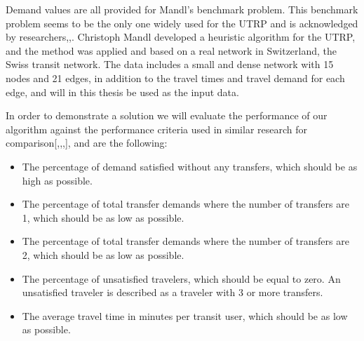 Demand values are all provided for Mandl's benchmark problem\citep{mandl79}. This benchmark problem seems to be the only one widely used for the UTRP and is acknowledged by researchers\citep{fan09},\citep{kechagiopoulos14},\citep{nikolic14}. Christoph Mandl\citep{mandl79} developed a heuristic algorithm for the UTRP, and the method was applied and based on a real network in Switzerland, the Swiss transit network\citep{mandl80}. The data includes a small and dense network with 15 nodes and 21 edges, in addition to the travel times and travel demand for each edge, and will in this thesis be used as the input data. %



In order to demonstrate a solution we will evaluate the performance of our algorithm against the performance criteria used in similar research for comparison[\citep{kechagiopoulos14},\citep{mandl80},\citep{nikolic14},\citep{fan09}], and are the following:
\begin{itemize}
\item The percentage of demand satisfied without any transfers, which should be as high as possible.
\item The percentage of total transfer demands where the number of transfers are 1, which should be as low as possible.
\item The percentage of total transfer demands where the number of transfers are 2, which should be as low as possible.
\item The percentage of unsatisfied travelers, which should be equal to zero. An unsatisfied traveler is described as a traveler with 3 or more transfers.
\item The average travel time in minutes per transit user, which should be as low as possible. %
\end{itemize}

